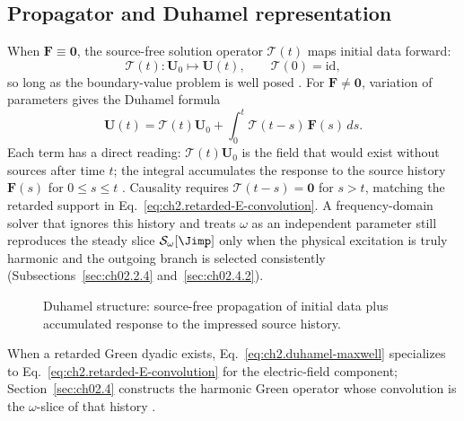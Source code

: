 \subsection{Propagator and Duhamel representation}
\label{sec:ch02.2.8}

When $\mathbf{F}\equiv\mathbf{0}$, the source-free solution operator $\mathcal{T}(t)$ maps initial data forward:
\begin{equation}
\label{eq:ch2.time-semigroup-definition}
\mathcal{T}(t):\mathbf{U}_0\longmapsto \mathbf{U}(t),
\qquad
\mathcal{T}(0)=\mathrm{id},
\end{equation}
so long as the boundary-value problem is well posed \cite{stratton1941}. For $\mathbf{F}\neq\mathbf{0}$, variation of parameters gives the Duhamel formula
\begin{equation}
\label{eq:ch2.duhamel-maxwell}
\mathbf{U}(t)
=
\mathcal{T}(t)\mathbf{U}_0
+\int_0^t \mathcal{T}(t-s)\,\mathbf{F}(s)\,ds.
\end{equation}
Each term has a direct reading: $\mathcal{T}(t)\mathbf{U}_0$ is the field that would exist without sources after time $t$; the integral accumulates the response to the source history $\mathbf{F}(s)$ for $0\le s\le t$ \cite{stratton1941,jackson1999}. Causality requires $\mathcal{T}(t-s)=\mathbf{0}$ for $s>t$, matching the retarded support in Eq.~\eqref{eq:ch2.retarded-E-convolution}. A frequency-domain solver that ignores this history and treats $\omega$ as an independent parameter still reproduces the steady slice $\mathcal{S}_\omega[\Jimp]$ only when the physical excitation is truly harmonic and the outgoing branch is selected consistently (Subsections~\ref{sec:ch02.2.4} and~\ref{sec:ch02.4.2}).

\begin{figure}[t]
\centering
{}
\caption{Duhamel structure: source-free propagation of initial data plus accumulated response to the impressed source history.}
\label{fig:ch2.duhamel-evolution}
\end{figure}

When a retarded Green dyadic exists, Eq.~\eqref{eq:ch2.duhamel-maxwell} specializes to Eq.~\eqref{eq:ch2.retarded-E-convolution} for the electric-field component; Section~\ref{sec:ch02.4} constructs the harmonic Green operator whose convolution is the $\omega$-slice of that history \cite{stratton1941,harrington2001}.
